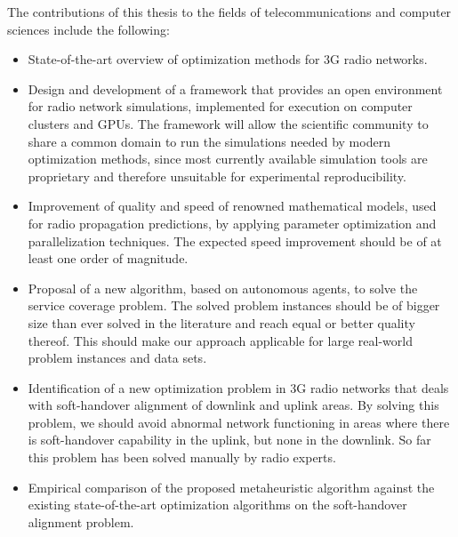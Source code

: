The contributions of this thesis to the fields of telecommunications
and computer sciences include the following:
\begin{itemize}
\item State-of-the-art overview of optimization methods for 3G radio networks.
\item Design and development of a framework that provides an open environment
for radio network simulations, implemented for execution on computer
clusters and GPUs. The framework will allow the scientific community
to share a common domain to run the simulations needed by modern optimization
methods, since most currently available simulation tools are proprietary
and therefore unsuitable for experimental reproducibility.
\item Improvement of quality and speed of renowned mathematical models,
used for radio propagation predictions, by applying parameter optimization
and parallelization techniques. The expected speed improvement should
be of at least one order of magnitude.
\item Proposal of a new algorithm, based on autonomous agents, to solve
the service coverage problem. The solved problem instances should
be of bigger size than ever solved in the literature and reach equal
or better quality thereof. This should make our approach applicable
for large real-world problem instances and data sets.
\item Identification of a new optimization problem in 3G radio networks
that deals with soft-handover alignment of downlink and uplink areas.
By solving this problem, we should avoid abnormal network functioning
in areas where there is soft-handover capability in the uplink, but
none in the downlink. So far this problem has been solved manually
by radio experts.
\item Empirical comparison of the proposed metaheuristic algorithm against
the existing state-of-the-art optimization algorithms on the soft-handover
alignment problem.\end{itemize}

